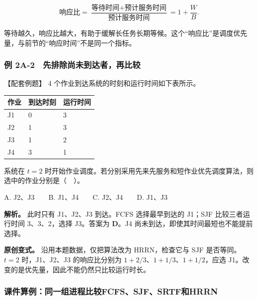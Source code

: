 \[\text{响应比}=\frac{\text{等待时间}+\text{预计服务时间}}{\text{预计服务时间}}=1+\frac{W}{B}.\]

等待越久，响应比越大，有助于缓解长任务长期等候。这个``响应比''是调度优先量，与前节的``响应时间''不是同一个指标。

\subsubsection{例 2A-2　先排除尚未到达者，再比较}\label{OS02-ex2-2}

\begin{example}[配套例题]

【配套例题】 4 个作业到达系统的时刻和运行时间如下表所示。

\begin{wideblock}

\par\medskip\noindent\begin{minipage}{\linewidth}\fontsize{9.3}{12}\selectfont\begin{tabularx}{\linewidth}{@{}YYY@{}}
\toprule\noalign{}
作业 & 到达时刻 & 运行时间 \\
\midrule\noalign{}


J1 & 0 & 3 \\
J2 & 1 & 3 \\
J3 & 1 & 2 \\
J4 & 3 & 1 \\
\bottomrule\end{tabularx}
\end{minipage}\par\medskip

\end{wideblock}

系统在 \(t=2\) 时开始作业调度。若分别采用先来先服务和短作业优先调度算法，则选中的作业分别是（　）。

A. J2、J3　　B. J1、J4　　C. J2、J4　　D. J1、J3

\end{example}

\textbf{解析。} 此时只有 J1、J2、J3 到达。FCFS 选择最早到达的 J1；SJF 比较三者运行时间 3、3、2，选择 J3。答案为 \textbf{D}。J4 尚未到达，即使其时间最短也不能提前选择。

\textbf{原创变式。} 沿用本题数据，仅把算法改为 HRRN，检查它与 SJF 是否等同。\(t=2\) 时，J1、J2、J3 的响应比分别为 \(1+2/3\)、\(1+1/3\)、\(1+1/2\)，应选 J1。改变的是优先量，因此不能仍然只比较运行时长。

\subsubsection{课件算例：同一组进程比较FCFS、SJF、SRTF和HRRN}\label{OS02-lecture-scheduling}

